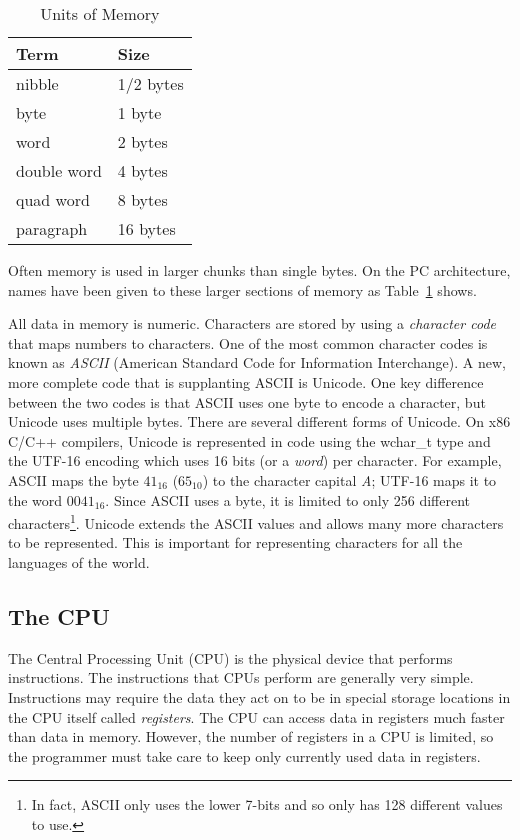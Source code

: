 \begin{table}[t]
\begin{center}
\begin{tabular}{|l|l|}
\hline
Term & Size \\ \hline
nibble & 1/2 bytes \\ \hline
byte & 1 byte \\ \hline
word & 2 bytes \\ \hline
double word & 4 bytes \\ \hline
quad word & 8 bytes \\ \hline
paragraph & 16 bytes \\ \hline
\end{tabular}
\caption{ Units of Memory \label{tab:mem_units} }
\end{center}
\end{table}

Often memory is used in larger chunks than single bytes. On
the PC architecture, names have been given to these larger sections of
memory as Table~\ref{tab:mem_units} shows.

All data in memory is numeric. Characters are stored by using a
\emph{character code} that maps numbers to characters. One of the
most common character codes is known as \emph{ASCII} (American
Standard Code for Information Interchange). A new, more complete code
that is supplanting ASCII is Unicode. One key difference between the
two codes is that ASCII uses one byte to encode a character, but
Unicode uses multiple bytes. There are several different forms of Unicode.
On x86 C/C++ compilers, Unicode is represented in code using the
{\code wchar\_t} type and the UTF-16 encoding which uses 16 bits (or a
\emph{word}) per character. For example, ASCII maps the byte $41_{16}$
($65_{10}$) to the character capital \emph{A}; UTF-16 maps it to the
word $0041_{16}$. Since ASCII uses a byte, it is limited to only 256
different characters\footnote{In fact, ASCII only uses the lower 7-bits
and so only has 128 different values to use.}. Unicode extends the ASCII
values and allows many more characters to be represented. This is important
for representing characters for all the languages of the world.

\subsection{The CPU}

The Central Processing Unit (CPU) is the physical device that performs
instructions. The instructions that CPUs perform are generally very
simple. Instructions may require the data they act on to be in special
storage locations in the CPU itself called
\emph{registers}.  The CPU can access data in registers
much faster than data in memory. However, the number of registers in a
CPU is limited, so the programmer must take care to keep only
currently used data in registers.

